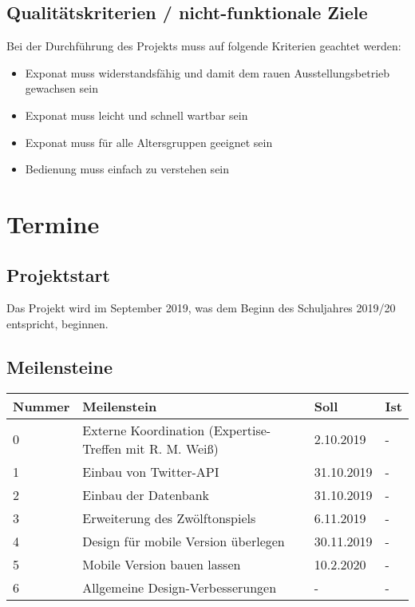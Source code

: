 \documentclass[a4paper]{scrartcl}
\begin{document}
\subsection{Qualitätskriterien / nicht-funktionale Ziele}
Bei der Durchführung des Projekts muss auf folgende Kriterien geachtet werden:
\begin{itemize}
	\item Exponat muss widerstandsfähig und damit dem rauen Ausstellungsbetrieb gewachsen sein
	\item Exponat muss leicht und schnell wartbar sein
	\item Exponat muss für alle Altersgruppen geeignet sein
	\item Bedienung muss einfach zu verstehen sein
\end{itemize}

\section{Termine}

\subsection{Projektstart}
Das Projekt wird im September 2019, was dem Beginn des Schuljahres 2019/20 entspricht, beginnen.

\subsection{Meilensteine}
\begin{center}
	\begin{tabular}{|l|l|l|l|}
		\hline
		\textbf{Nummer} & \textbf{Meilenstein} & \textbf{Soll} & \textbf{Ist} \\
		\hline
		0 & Externe Koordination (Expertise-Treffen mit R. M. Weiß) & 2.10.2019 & -\\
		1 & Einbau von Twitter-API & 31.10.2019 & -\\
		2 & Einbau der Datenbank & 31.10.2019 & -\\
		3 & Erweiterung des Zwölftonspiels & 6.11.2019 & -\\
		4 & Design für mobile Version überlegen & 30.11.2019 & -\\
		5 & Mobile Version bauen lassen & 10.2.2020 & -\\
		6 & Allgemeine Design-Verbesserungen & - & -\\
		\hline
	\end{tabular}
\end{center}
\end{document}
